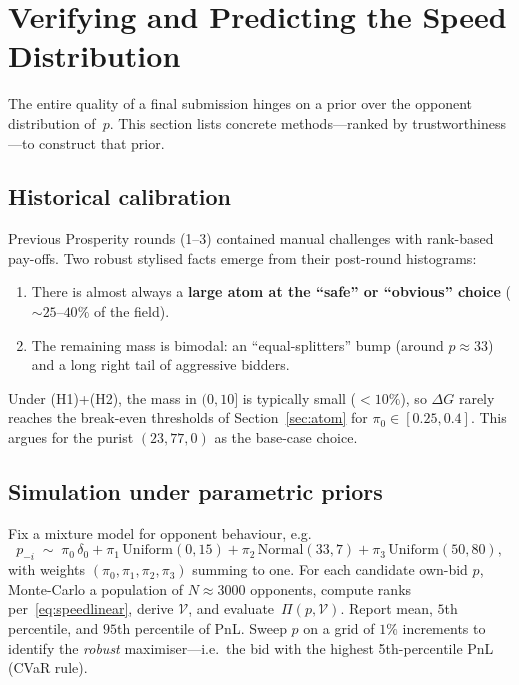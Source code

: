 \documentclass[11pt,a4paper]{article}
\theoremstyle{definition}
\theoremstyle{remark}
\newcommand{\Sp}{\mathcal{V}}
\begin{document}
\section{Verifying and Predicting the Speed Distribution}\label{sec:predict}

The entire quality of a final submission hinges on a prior over the opponent
distribution of~\(p\). This section lists concrete methods---ranked by
trustworthiness---to construct that prior.

\subsection{Historical calibration}
Previous Prosperity rounds (1--3) contained manual challenges with rank-based
pay-offs. Two robust stylised facts emerge from their post-round histograms:
\begin{enumerate}[leftmargin=*,itemsep=2pt]
  \item[(H1)] There is almost always a \textbf{large atom at the ``safe'' or
  ``obvious'' choice} (\(\sim\!25\)--\(40\%\) of the field).
  \item[(H2)] The remaining mass is bimodal: an ``equal-splitters'' bump (around
  \(p\approx 33\)) and a long right tail of aggressive bidders.
\end{enumerate}
Under (H1)+(H2), the mass in \((0,10]\) is typically small ($<10\%$), so
\(\Delta G\) rarely reaches the break-even thresholds of
Section~\ref{sec:atom} for \(\pi_0\in[0.25,0.4]\). This argues for the purist
\((23,77,0)\) as the base-case choice.

\subsection{Simulation under parametric priors}
Fix a mixture model for opponent behaviour, e.g.\
\[
p_{-i}\;\sim\;\pi_0\,\delta_0 + \pi_1\,\mathrm{Uniform}(0,15) + \pi_2\,\mathrm{Normal}(33,7) + \pi_3\,\mathrm{Uniform}(50,80),
\]
with weights \((\pi_0,\pi_1,\pi_2,\pi_3)\) summing to one. For each candidate
own-bid \(p\), Monte-Carlo a population of \(N\approx 3000\) opponents, compute
ranks per~\eqref{eq:speedlinear}, derive \(\Sp\), and evaluate~\(\Pi(p,\Sp)\).
Report mean, \(5\)th percentile, and \(95\)th percentile of PnL. Sweep \(p\) on
a grid of \(1\%\) increments to identify the \emph{robust} maximiser---i.e.\
the bid with the highest 5th-percentile PnL (CVaR rule).
\end{document}
